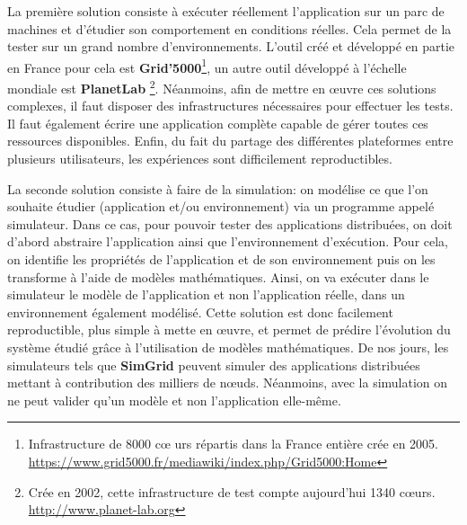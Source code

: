 La première solution consiste à exécuter réellement l'application sur un parc de
machines et d'étudier son comportement en conditions réelles. Cela permet de la
tester sur un grand nombre d'environnements. L'outil créé et développé en partie
en France pour cela est \textbf{Grid'5000}\footnote{Infrastructure de 8000 c\oe
  urs répartis dans la France entière crée en
  2005. \\ \url{https://www.grid5000.fr/mediawiki/index.php/Grid5000:Home}}\citep{GRID5000},
un autre outil développé à l'échelle mondiale est
\textbf{PlanetLab} \footnote{Crée en 2002, cette infrastructure de test compte
  aujourd'hui 1340 c\oe urs. \\ \url{http://www.planet-lab.org}}. Néanmoins,
afin de mettre en \oe uvre ces solutions complexes, il faut disposer des
infrastructures nécessaires pour effectuer les tests. Il faut également écrire
une application complète capable de gérer toutes ces ressources
disponibles. Enfin, du fait du partage des différentes plateformes entre
plusieurs utilisateurs, les expériences sont difficilement reproductibles.

La seconde solution consiste à faire de la simulation: on modélise ce que l'on
souhaite étudier (application et/ou environnement) via un programme appelé
simulateur. Dans ce cas, pour pouvoir tester des applications distribuées, on doit d'abord abstraire l'application ainsi que l'environnement
d'exécution. Pour cela, on identifie les propriétés de l'application et de son
environnement puis on les transforme à l'aide de modèles mathématiques. Ainsi,
on va exécuter dans le simulateur le modèle de l'application et non
l'application réelle, dans un environnement également modélisé. Cette solution
est donc facilement reproductible, plus simple à mette en \oe uvre, et permet de
prédire l'évolution du système étudié grâce à l'utilisation de modèles
mathématiques. De nos jours, les simulateurs tels que
\textbf{SimGrid}\citep{CASANOVA:SimGrid, MARTIN:SimGrid} peuvent simuler des
applications distribuées mettant à contribution des milliers de
n\oe uds. Néanmoins, avec la simulation on ne peut valider qu'un modèle et non
l'application elle-même.

